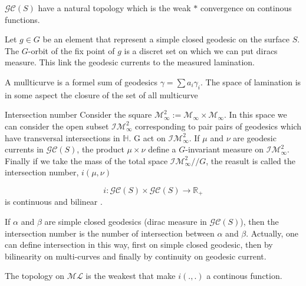 \begin{rmq}
$\mathcal{GC}(S)$ have a natural topology which is the weak $*$ convergence on continous functions.
\end{rmq}

\begin{exmp}
Let $g \in G$ be an element that represent a simple closed geodesic on the surface $S$. The $G$-orbit of the fix point of $g$ is a discret set on which we can put diracs measure. This link the geodesic currents to the measured lamination.
\end{exmp}

\begin{rmq}
A mullticurve is a formel sum of geodesics $\gamma = \sum a_i \gamma_i$. The space of lamination is in some aspect the closure of the set of all multicurve
\end{rmq}

\begin{dfnt}{Intersection number}
Consider the square $\mathcal{M}_\infty^2 := \mathcal{M}_\infty \times \mathcal{M}_\infty $. In this space we can consider the open subset $\mathcal{IM}^2_\infty$ corresponding to pair pairs of geodesics which have transversal intersections in $\mathbb{H}$. G act on $\mathcal{IM}^2_\infty$.
If $\mu$ and $\nu$ are geodesic currents in $\mathcal{GC}(S)$, the product $\mu \times \nu$ define a $G$-invariant measure on $\mathcal{IM}^2_\infty$.
Finally if we take the mass of the total space $\mathcal{IM}^2_\infty // G$, the reasult is called the intersection number, $i(\mu,\nu)$
\end{dfnt}

\begin{prop}
\[
i: \mathcal{GC}(S) \times \mathcal{GC}(S) \to \mathbb{R}_+
\]
is continuous and bilinear \cite{Bonahon1988}.
\end{prop}

\begin{rmq}
If $\alpha$ and $\beta$ are simple closed geodesics (dirac measure in $\mathcal{GC}(S)$), then the intersection number is the number of intersection between $\alpha$ and $\beta$.
Actually, one can define intersection in this way, first on simple closed geodesic, then by bilinearity on multi-curves and finally by continuity on geodesic current.
\end{rmq}

\begin{rmq}
The topology on $\mathcal{ML}$ is the weakest that make $i(.,.)$ a continous function.
\end{rmq}


